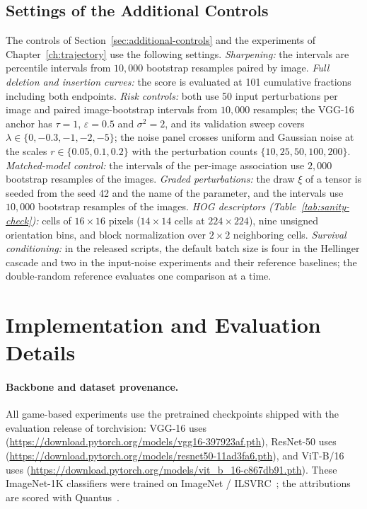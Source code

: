 \subsection{Settings of the Additional Controls}\label{app:control-settings}

The controls of Section~\ref{sec:additional-controls} and the experiments of Chapter~\ref{ch:trajectory} use the following settings. \emph{Sharpening:} the intervals are percentile intervals from $10{,}000$ bootstrap resamples paired by image. \emph{Full deletion and insertion curves:} the score is evaluated at 101 cumulative fractions including both endpoints. \emph{Risk controls:} both use 50 input perturbations per image and paired image-bootstrap intervals from $10{,}000$ resamples; the VGG-16 anchor has $\tau=1$, $\varepsilon=0.5$ and $\sigma^2=2$, and its validation sweep covers $\lambda\in\{0,-0.3,-1,-2,-5\}$; the noise panel crosses uniform and Gaussian noise at the scales $r\in\{0.05,0.1,0.2\}$ with the perturbation counts $\{10,25,50,100,200\}$. \emph{Matched-model control:} the intervals of the per-image association use $2{,}000$ bootstrap resamples of the images. \emph{Graded perturbations:} the draw $\xi$ of a tensor is seeded from the seed 42 and the name of the parameter, and the intervals use $10{,}000$ bootstrap resamples of the images. \emph{HOG descriptors (Table~\ref{tab:sanity-check}):} cells of $16\times16$ pixels ($14\times14$ cells at $224\times224$), nine unsigned orientation bins, and block normalization over $2\times2$ neighboring cells. \emph{Survival conditioning:} in the released scripts, the default batch size is four in the Hellinger cascade and two in the input-noise experiments and their reference baselines; the double-random reference evaluates one comparison at a time.

\section{Implementation and Evaluation Details}\label{app:extended_protocol}

\paragraph{Backbone and dataset provenance.}
All game-based experiments use the pretrained checkpoints shipped with the evaluation release of torchvision: VGG-16 uses 
(\url{https://download.pytorch.org/models/vgg16-397923af.pth}),
ResNet-50 uses 
(\url{https://download.pytorch.org/models/resnet50-11ad3fa6.pth}), and ViT-B/16 uses
(\url{https://download.pytorch.org/models/vit_b_16-c867db91.pth}). These ImageNet-1K classifiers were trained on ImageNet / ILSVRC~\parencite{Deng2009,Russakovsky2015ilsvrc}; the attributions are scored with Quantus~\parencite{Hedstrom2023}.

